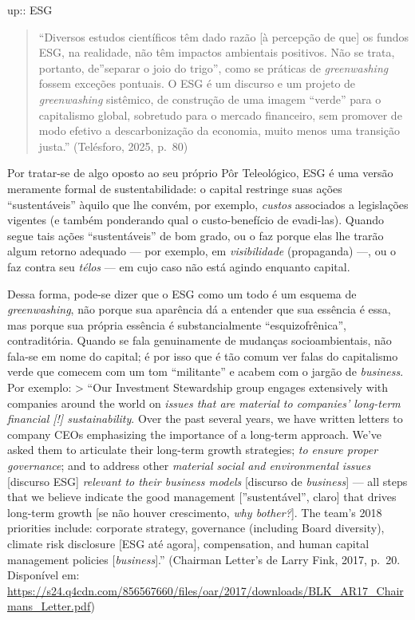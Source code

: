 up:: ESG

\begin{quote}
``Diversos estudos científicos têm dado razão {[}à percepção de que{]}
os fundos ESG, na realidade, não têm impactos ambientais positivos. Não
se trata, portanto, de''separar o joio do trigo'', como se práticas de
\textit{greenwashing} fossem exceções pontuais. O ESG é um discurso e um
projeto de \textit{greenwashing} sistêmico, de construção de uma imagem
``verde'' para o capitalismo global, sobretudo para o mercado
financeiro, sem promover de modo efetivo a descarbonização da economia,
muito menos uma transição justa.'' (Telésforo, 2025, p.~80)
\end{quote}

Por tratar-se de algo oposto ao seu próprio Pôr Teleológico, ESG é uma
versão meramente formal de sustentabilidade: o capital restringe suas
ações ``sustentáveis'' àquilo que lhe convém, por exemplo,
\textit{custos} associados a legislações vigentes (e também ponderando
qual o custo-benefício de evadi-las). Quando segue tais ações
``sustentáveis'' de bom grado, ou o faz porque elas lhe trarão algum
retorno adequado --- por exemplo, em \textit{visibilidade} (propaganda)
---, ou o faz contra seu \textit{télos} --- em cujo caso não está agindo
enquanto capital.

Dessa forma, pode-se dizer que o ESG como um todo é um esquema de
\textit{greenwashing}, não porque sua aparência dá a entender que sua
essência é essa, mas porque sua própria essência é substancialmente
``esquizofrênica'', contraditória. Quando se fala genuinamente de
mudanças socioambientais, não fala-se em nome do capital; é por isso que
é tão comum ver falas do capitalismo verde que comecem com um tom
``militante'' e acabem com o jargão de \textit{business}. Por exemplo:
\textgreater{} ``Our Investment Stewardship group engages extensively
with companies around the world on
\textit{issues that are material to companies’ long-term financial [!] sustainability}.
Over the past several years, we have written letters to company CEOs
emphasizing the importance of a long-term approach. We've asked them to
articulate their long-term growth strategies;
\textit{to ensure proper governance}; and to address other
\textit{material social and environmental issues} {[}discurso ESG{]}
\textit{relevant to their business models} {[}discurso de
\textit{business}{]} --- all steps that we believe indicate the good
management {[}''sustentável'', claro{]} that drives long-term growth
{[}se não houver crescimento, \textit{why bother?}{]}. The team's 2018
priorities include: corporate strategy, governance (including Board
diversity), climate risk disclosure {[}ESG até agora{]}, compensation,
and human capital management policies {[}\textit{business}{]}.''
(Chairman Letter's de Larry Fink, 2017, p.~20. Disponível em:
\url{https://s24.q4cdn.com/856567660/files/oar/2017/downloads/BLK_AR17_Chairmans_Letter.pdf})

